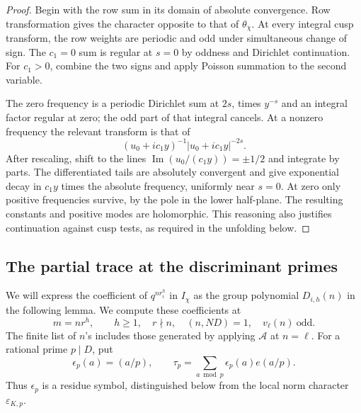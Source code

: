 \begin{proof}
Begin with the row sum in its domain of absolute convergence.
Row transformation gives the character opposite to that of
\(\theta_\chi\). At every integral cusp transform, the row weights
are periodic and odd under simultaneous change of sign. The
\(c_1=0\) sum is regular at \(s=0\) by oddness and Dirichlet
continuation. For \(c_1>0\), combine the two signs and apply Poisson
summation to the second variable.

The zero frequency is a periodic Dirichlet sum at \(2s\), times
\(y^{-s}\) and an integral factor regular at zero; the odd part of
that integral cancels. At a nonzero frequency the relevant transform
is that of
\[
 (u_0+ic_1y)^{-1}|u_0+ic_1y|^{-2s}.
\]
After rescaling, shift to the lines
\(\operatorname{Im}(u_0/(c_1y))=\pm1/2\) and integrate by parts.
The differentiated tails are absolutely convergent and give
exponential decay in \(c_1y\) times the absolute frequency, uniformly
near \(s=0\). At zero only positive frequencies survive, by the
pole in the lower half-plane. The resulting constants and positive
modes are holomorphic. This reasoning also justifies continuation
against cusp tests, as required in the unfolding below.
\end{proof}

\subsection{The partial trace at the discriminant primes}

We will express the coefficient of \(q^{nr_i^h}\) in \(I_\chi\)
as the group polynomial \(D_{i,h}(n)\) in the following lemma.
We compute these coefficients at
\[
 m=nr^h,\qquad h\ge1,\quad r\nmid n,\quad(n,ND)=1,\quad
 v_\ell(n)\ \text{odd}.
\]
The finite list of \(n\)'s includes those generated by applying
\(\mathcal A\) at \(n=\ell\). For a rational prime \(p\mid D\), put
\[
 \epsilon_p(a)=(a/p),\qquad
 \tau_p=\sum_{a\bmod p}\epsilon_p(a)e(a/p).
\]
Thus \(\epsilon_p\) is a residue symbol, distinguished below from
the local norm character \(\varepsilon_{K,p}\).

